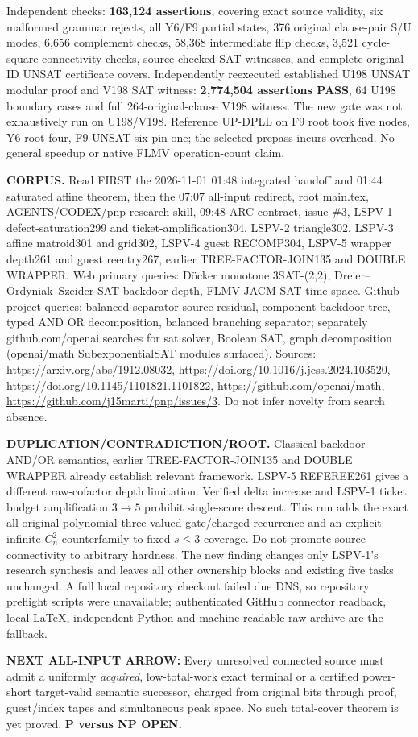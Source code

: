 \documentclass[11pt]{article}
\begin{document}
Independent checks: \textbf{163,124 assertions}, covering exact source validity, six malformed grammar rejects, all Y6/F9 partial states, 376 original clause-pair S/U modes, 6,656 complement checks, 58,368 intermediate flip checks, 3,521 cycle-square connectivity checks, source-checked SAT witnesses, and complete original-ID UNSAT certificate covers. Independently reexecuted established U198 UNSAT modular proof and V198 SAT witness: \textbf{2,774,504 assertions PASS}, 64 U198 boundary cases and full 264-original-clause V198 witness. The new gate was not exhaustively run on U198/V198. Reference UP-DPLL on F9 root took five nodes, Y6 root four, F9 UNSAT six-pin one; the selected prepass incurs overhead. No general speedup or native FLMV operation-count claim.

\noindent\textbf{CORPUS.} Read FIRST the 2026-11-01 01:48 integrated handoff and 01:44 saturated affine theorem, then the 07:07 all-input redirect, root main.tex, AGENTS/CODEX/pnp-research skill, 09:48 ARC contract, issue \#3, LSPV-1 defect-saturation299 and ticket-amplification304, LSPV-2 triangle302, LSPV-3 affine matroid301 and grid302, LSPV-4 guest RECOMP304, LSPV-5 wrapper depth261 and guest reentry267, earlier TREE-FACTOR-JOIN135 and DOUBLE WRAPPER. Web primary queries: D\"ocker monotone 3SAT-(2,2), Dreier--Ordyniak--Szeider SAT backdoor depth, FLMV JACM SAT time-space. Github project queries: balanced separator source residual, component backdoor tree, typed AND OR decomposition, balanced branching separator; separately github.com/openai searches for sat solver, Boolean SAT, graph decomposition (openai/math SubexponentialSAT modules surfaced). Sources: \url{https://arxiv.org/abs/1912.08032}, \url{https://doi.org/10.1016/j.jcss.2024.103520}, \url{https://doi.org/10.1145/1101821.1101822}, \url{https://github.com/openai/math}, \url{https://github.com/j15marti/pnp/issues/3}. Do not infer novelty from search absence.

\noindent\textbf{DUPLICATION/CONTRADICTION/ROOT.} Classical backdoor AND/OR semantics, earlier TREE-FACTOR-JOIN135 and DOUBLE WRAPPER already establish relevant framework. LSPV-5 REFEREE261 gives a different raw-cofactor depth limitation. Verified delta increase and LSPV-1 ticket budget amplification $3\to5$ prohibit single-score descent. This run adds the exact all-original polynomial three-valued gate/charged recurrence and an explicit infinite $C_n^2$ counterfamily to fixed $s\le3$ coverage. Do not promote source connectivity to arbitrary hardness. The new finding changes only LSPV-1's research synthesis and leaves all other ownership blocks and existing five tasks unchanged. A full local repository checkout failed due DNS, so repository preflight scripts were unavailable; authenticated GitHub connector readback, local LaTeX, independent Python and machine-readable raw archive are the fallback.

\noindent\textbf{NEXT ALL-INPUT ARROW:} Every unresolved connected source must admit a uniformly \emph{acquired}, low-total-work exact terminal or a certified power-short target-valid semantic successor, charged from original bits through proof, guest/index tapes and simultaneous peak space. No such total-cover theorem is yet proved. \textbf{P versus NP OPEN.}
\end{document}
